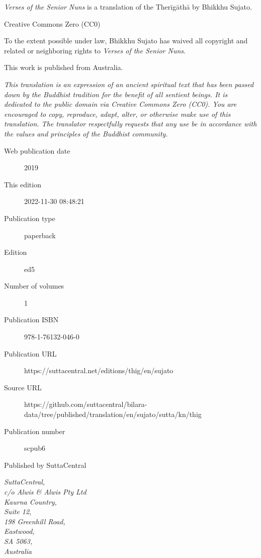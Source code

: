 \documentclass[12pt,openany]{book}%
\begin{document}
\begin{footnotesize}

\textit{Verses of the Senior Nuns} is a translation of the Therīgāthā by Bhikkhu Sujato.

\medskip

Creative Commons Zero (CC0)

To the extent possible under law, Bhikkhu Sujato has waived all copyright and related or neighboring rights to \textit{Verses of the Senior Nuns}.

\medskip

This work is published from Australia.

\begin{center}
\textit{This translation is an expression of an ancient spiritual text that has been passed down by the Buddhist tradition for the benefit of all sentient beings. It is dedicated to the public domain via Creative Commons Zero (CC0). You are encouraged to copy, reproduce, adapt, alter, or otherwise make use of this translation. The translator respectfully requests that any use be in accordance with the values and principles of the Buddhist community.}
\end{center}

\medskip

\begin{description}
    \item[Web publication date] 2019
    \item[This edition] 2022-11-30 08:48:21
    \item[Publication type] paperback
    \item[Edition] ed5
    \item[Number of volumes] 1
    \item[Publication ISBN] 978-1-76132-046-0
    \item[Publication URL] https://suttacentral.net/editions/thig/en/sujato
    \item[Source URL] https://github.com/suttacentral/bilara-data/tree/published/translation/en/sujato/sutta/kn/thig
    \item[Publication number] scpub6
\end{description}

\medskip

Published by SuttaCentral

\medskip

\textit{SuttaCentral,\\
c/o Alwis \& Alwis Pty Ltd\\
Kaurna Country,\\
Suite 12,\\
198 Greenhill Road,\\
Eastwood,\\
SA 5063,\\
Australia}

\end{footnotesize}
\end{document}
